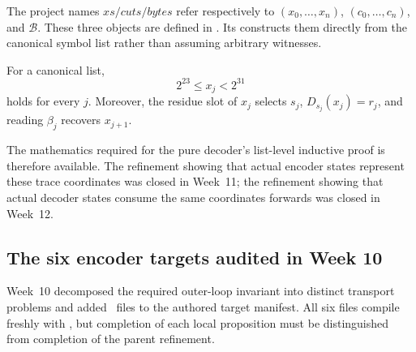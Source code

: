 The project names \(xs/cuts/bytes\) refer respectively to
\((x_0,\ldots,x_n)\), \((c_0,\ldots,c_n)\), and \(\mathcal B\).
These three objects are defined in .
Its  constructs them directly from the canonical
symbol list rather than assuming arbitrary witnesses.

\begin{verified}
For a canonical list,
\[
  2^{23}\le x_j<2^{31}
\]
holds for every \(j\). Moreover, the residue slot of \(x_j\) selects \(s_j\),
\(D_{s_j}(x_j)=r_j\), and reading \(\beta_j\) recovers \(x_{j+1}\).
\end{verified}

The mathematics required for the pure decoder's list-level inductive proof is
therefore available. The refinement showing that actual encoder states represent
these trace coordinates was closed in Week~11; the refinement showing that actual
decoder states consume the same coordinates forwards was closed in Week~12.

\subsection{The six encoder targets audited in Week 10}

Week~10 decomposed the required outer-loop invariant into distinct transport
problems and added \WeekTenTargetCount\ files to the authored target manifest.
All six files compile freshly with , but completion of each
local proposition must be distinguished from completion of the parent refinement.

